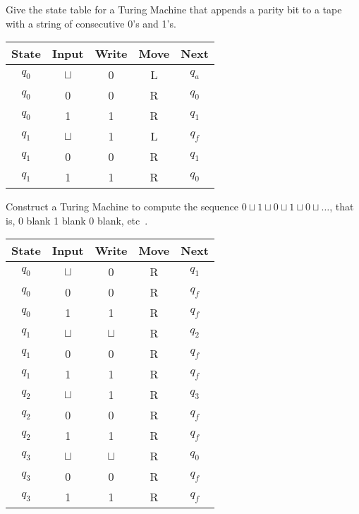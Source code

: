 \documentclass[a4paper, 12pt]{exam}
\begin{document}
\begin{questions}
\question
  Give the state table for a Turing Machine that appends a parity bit to a tape with a string of consecutive 0's and 1's.
  \begin{solution}
    \begin{table}[H]
      \centering
      \begin{tabular}{ccccc}
        \toprule
            State & Input & Write & Move & Next \\
        \midrule
            $q_0$ & $\sqcup$ & 0 & L & $q_a$ \\
            $q_0$ & 0 & 0 & R & $q_0$ \\
            $q_0$ & 1 & 1 & R & $q_1$ \\
        \midrule
            $q_1$ & $\sqcup$ & 1 & L & $q_f$ \\
            $q_1$ & 0 & 0 & R & $q_1$ \\
            $q_1$ & 1 & 1 & R & $q_0$ \\
        \bottomrule
        \hline
      \end{tabular}
    \end{table}
  \end{solution}


\question
  Construct a Turing Machine to compute the sequence $0 \sqcup 1 \sqcup 0 \sqcup 1 \sqcup 0 \sqcup \ldots$, that is, 0 blank 1 blank 0 blank, etc~\cite{turing37}.
  \begin{solution}
    \begin{table}[H]
      \centering
      \begin{tabular}{ccccc}
        \toprule
            State & Input & Write & Move & Next \\ 
        \midrule
            $q_0$ & $\sqcup$ & 0 & R & $q_1$ \\
            $q_0$ & 0 & 0 & R & $q_f$ \\
            $q_0$ & 1 & 1 & R & $q_f$ \\
        \midrule
            $q_1$ & $\sqcup$ & $\sqcup$ & R & $q_2$ \\
            $q_1$ & 0 & 0 & R & $q_f$ \\
            $q_1$ & 1 & 1 & R & $q_f$ \\
        \midrule
            $q_2$ & $\sqcup$ & 1 & R & $q_3$ \\
            $q_2$ & 0 & 0 & R & $q_f$ \\
            $q_2$ & 1 & 1 & R & $q_f$ \\
        \midrule
            $q_3$ & $\sqcup$ & $\sqcup$ & R & $q_0$ \\
            $q_3$ & 0 & 0 & R & $q_f$ \\
            $q_3$ & 1 & 1 & R & $q_f$ \\
        \bottomrule
        \hline
      \end{tabular}
    \end{table}
  \end{solution}
 


\end{questions}
\end{document}
